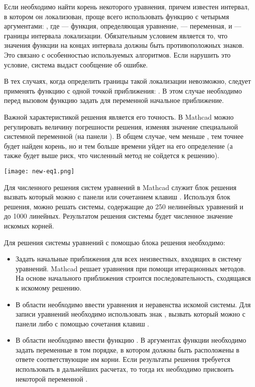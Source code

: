 Если необходимо найти корень некоторого уравнения, причем известен интервал, в котором он локализован, проще всего использовать функцию  с четырьмя аргументами: , где  --- функция, определяющая уравнение,  --- переменная,  и  --- границы интервала локализации. Обязательным условием является то, что значения функции на концах интервала должны быть противоположных знаков. Это связано с особенностью используемых  алгоритмов. Если нарушить это условие, система выдаст сообщение об ошибке.

В тех случаях, когда определить границы такой локализации невозможно, следует применять функцию  с одной точкой приближения: . В этом случае необходимо перед вызовом функцию  задать для переменной  начальное приближение.

Важной характеристикой решения является его точность. В Mathcad можно регулировать величину погрешности решения, изменяя значение специальной системной переменной  (на панели ). В общем случае, чем меньше , тем точнее будет найден корень, но и тем больше времени уйдет на его определение (а также будет выше риск, что численный метод не сойдется к решению).

\begin{center}
	\texttt{[image: new-eq1.png]}
\end{center}

Для численного решения систем уравнений в Mathcad служит блок решения вызвать который можно с панели  или сочетанием клавиш . Используя блок решения, можно решать системы, содержащие до 250 нелинейных уравнений и до 1000 линейных. Результатом решения системы будет численное значение искомых корней.

Для решения системы уравнений с помощью блока решения необходимо:
\begin{itemize}
	\item Задать начальные приближения для всех неизвестных, входящих в систему уравнений. Mathcad решает уравнения при помощи итерационных методов. На основе начального приближения строится последовательность, сходящаяся к искомому решению.
	\item В области  необходимо ввести уравнения и неравенства искомой системы. Для записи уравнений необходимо использовать знак , вызвать который можно с панели  либо с помощью сочетания клавиш \keys{\ctrl+=}.
	\item В области  необходимо ввести функцию . В аргументах функции необходимо задать переменные в том порядке, в котором должны быть расположены в ответе соответствующие им корни. Если результаты решения требуется использовать в дальнейших расчетах, то тогда их необходимо присвоить некоторой переменной .
\end{itemize}

